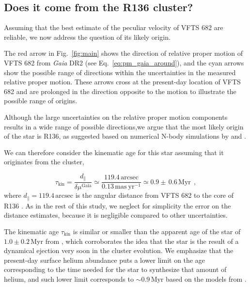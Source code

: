 \documentclass[apjl,twocolumn]{emulateapj}
\newcommand{\todo}[1]{{\large $\blacksquare$~\textbf{\color{red}[#1]}}~$\blacksquare$}
\DeclareRobustCommand{\Eqref}[1]{Eq.~\ref{#1}}
\DeclareRobustCommand{\Figref}[1]{Fig.~\ref{#1}}
\begin{document}
\subsection{Does it come from the R136 cluster?}
\label{sec:r136_origin}

Assuming that the best estimate of the peculiar velocity of VFTS 682
are reliable, we now address the question of its likely origin.

The red arrow in \Figref{fig:main} shows the direction of relative proper motion of
VFTS 682 from \emph{Gaia} DR2 (see \Eqref{eq:pm_gaia_around}), and the cyan arrows show the possible
range of directions within the uncertainties in the measured relative proper
motion. These arrows cross at the present-day location of VFTS 682 and
are prolonged in the direction opposite to the motion to illustrate
the possible range of origins. %

Although the large uncertainties on the relative proper motion
components results in a wide range of possible directions,we argue that the most likely origin of the star is R136,
as suggested based on numerical N-body simulations by \cite{fujii:11}
and \cite{banerjee:12}.

We can therefore consider the kinematic age for this star assuming
that it originates from the cluster,

\begin{equation}
  \label{eq:kin_age}
  \tau_\mathrm{kin} = \frac{d_\parallel}{\delta\mu^\mathrm{Gaia}} \simeq
  \frac{119.4\,\mathrm{arcsec}}{0.13\,\mathrm{mas\ yr^{-1}}} \simeq 0.9\pm\,0.6\, \mathrm{Myr} \ \ ,
\end{equation}
where $d_\parallel = 119.4\,\mathrm{arcsec}$ is the angular distance from VFTS 682 to
the core of R136 \citep[corresponding to $\sim$29\,pc at LMC distance,][]{bestenlehner:11}.
As in the rest of this study, we neglect for
simplicity the error on the distance estimates, because it is negligible compared to other uncertainties.

The kinematic age $\tau_\mathrm{kin}$ is similar or smaller than the apparent age
of the star of $1.0\pm 0.2$\,Myr from \cite{schneider:18}, which
corroborates the idea that the star is the result of a dynamical
ejection very soon in the cluster evolution. We emphasize that the
present-day surface helium abundance
\citep[$Y\simeq0.5$,][]{bestenlehner:11, rubio-diez:17} puts a lower
limit on the age corresponding to the time needed for the star to
synthesize that amount of helium, and such lower limit corresponds to
$\sim$0.9\,Myr based on the models from \cite{kohler:15}.
\end{document}
